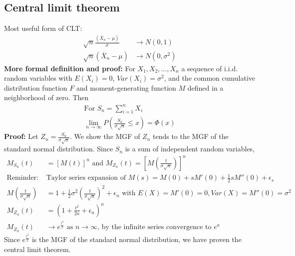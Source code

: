 \documentclass{article}
\begin{document}
\subsection{Central limit theorem}
Most useful form of CLT:
\begin{align*}
	\sqrt{n}\frac{(\overline{X}_n - \mu)}{\sigma} &\longrightarrow N(0, 1)\\
	\sqrt{n}(\overline{X}_n - \mu) &\longrightarrow N(0, \sigma^2)
\end{align*}
\textbf{More formal definition and proof:} For $X_1, X_2, \dots, X_n$ a sequence of i.i.d. random variables with $E(X_i) = 0$,  $Var(X_i) = \sigma^2$, and the common cumulative distribution function $F$ and moment-generating function $M$ defined in a neighborhood of zero. Then
\begin{align*}
	\textrm{For } S_n = \sum_{i=1}^nX_i\\
	\lim_{n \rightarrow \infty}P(\frac{S_n}{\sigma \sqrt{n}} \leq x) = \Phi(x)
\end{align*}
\textbf{Proof:} Let $Z_n  = \frac{S_n}{\sigma \sqrt{n}}$. We show the MGF of $Z_n$ tends to the MGF of the standard normal distribution. Since $S_n$ is a sum of independent random variables,
\begin{align*}
	M_{S_n}(t) &= [M(t)]^n \textrm{ and } M_{Z_n}(t) = [M(\frac{t}{\sigma \sqrt{n}})]^n\\
	\textrm{Reminder: } & \textrm{Taylor series expansion of } M(s) = M(0)+sM'(0)+ \frac{1}{2}sM''(0) + \epsilon_s \\
	M(\frac{t}{\sigma\sqrt{n}}) &= 1 + \frac{1}{2}\sigma^2(\frac{t}{\sigma \sqrt{n}})^2 + \epsilon_n \textrm{ with } E(X) = M'(0) = 0, Var(X) = M''(0) = \sigma^2\\
	M_{Z_n}(t) &= (1 + \frac{t^2}{2n} + \epsilon_n)^n\\
	M_{Z_n}(t) &\longrightarrow e^{\frac{t^2}{2}} \textrm{ as } n \longrightarrow \infty \textrm{, by the infinite series convergence to $e^a$}
\end{align*}
Since $e^{\frac{t^2}{2}}$ is the MGF of the standard normal distribution, we have proven the central limit theorem.
\end{document}
